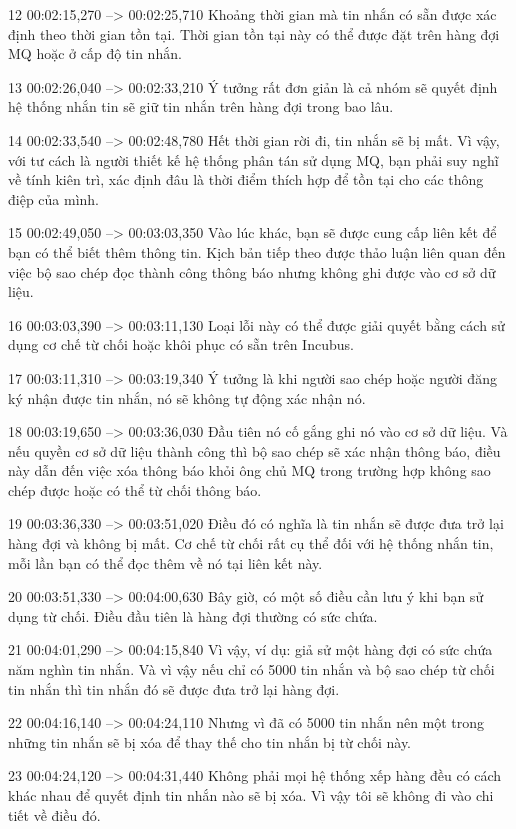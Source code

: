 12
00:02:15,270 --> 00:02:25,710
Khoảng thời gian mà tin nhắn có sẵn được xác định theo thời gian tồn tại.  Thời gian tồn tại này có thể được đặt trên hàng đợi MQ hoặc ở cấp độ tin nhắn.

13
00:02:26,040 --> 00:02:33,210
Ý tưởng rất đơn giản là cả nhóm sẽ quyết định hệ thống nhắn tin sẽ giữ tin nhắn trên hàng đợi trong bao lâu.

14
00:02:33,540 --> 00:02:48,780
Hết thời gian rời đi, tin nhắn sẽ bị mất.  Vì vậy, với tư cách là người thiết kế hệ thống phân tán sử dụng MQ, bạn phải suy nghĩ về tính kiên trì, xác định đâu là thời điểm thích hợp để tồn tại cho các thông điệp của mình.

15
00:02:49,050 --> 00:03:03,350
Vào lúc khác, bạn sẽ được cung cấp liên kết để bạn có thể biết thêm thông tin.  Kịch bản tiếp theo được thảo luận liên quan đến việc bộ sao chép đọc thành công thông báo nhưng không ghi được vào cơ sở dữ liệu.

16
00:03:03,390 --> 00:03:11,130
Loại lỗi này có thể được giải quyết bằng cách sử dụng cơ chế từ chối hoặc khôi phục có sẵn trên Incubus.

17
00:03:11,310 --> 00:03:19,340
Ý tưởng là khi người sao chép hoặc người đăng ký nhận được tin nhắn, nó sẽ không tự động xác nhận nó.

18
00:03:19,650 --> 00:03:36,030
Đầu tiên nó cố gắng ghi nó vào cơ sở dữ liệu.  Và nếu quyền cơ sở dữ liệu thành công thì bộ sao chép sẽ xác nhận thông báo, điều này dẫn đến việc xóa thông báo khỏi ông chủ MQ trong trường hợp không sao chép được hoặc có thể từ chối thông báo.

19
00:03:36,330 --> 00:03:51,020
Điều đó có nghĩa là tin nhắn sẽ được đưa trở lại hàng đợi và không bị mất.  Cơ chế từ chối rất cụ thể đối với hệ thống nhắn tin, mỗi lần bạn có thể đọc thêm về nó tại liên kết này.

20
00:03:51,330 --> 00:04:00,630
Bây giờ, có một số điều cần lưu ý khi bạn sử dụng từ chối.  Điều đầu tiên là hàng đợi thường có sức chứa.

21
00:04:01,290 --> 00:04:15,840
Vì vậy, ví dụ: giả sử một hàng đợi có sức chứa năm nghìn tin nhắn.  Và vì vậy nếu chỉ có 5000 tin nhắn và bộ sao chép từ chối tin nhắn thì tin nhắn đó sẽ được đưa trở lại hàng đợi.

22
00:04:16,140 --> 00:04:24,110
Nhưng vì đã có 5000 tin nhắn nên một trong những tin nhắn sẽ bị xóa để thay thế cho tin nhắn bị từ chối này.

23
00:04:24,120 --> 00:04:31,440
Không phải mọi hệ thống xếp hàng đều có cách khác nhau để quyết định tin nhắn nào sẽ bị xóa.  Vì vậy tôi sẽ không đi vào chi tiết về điều đó.

